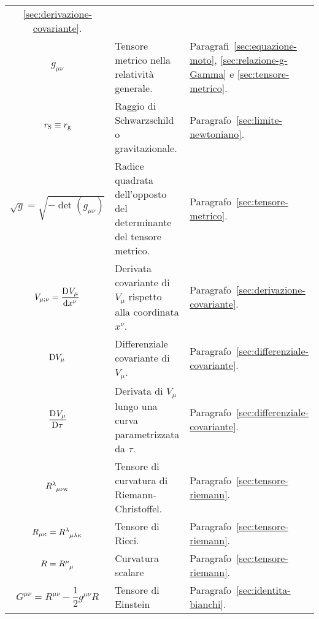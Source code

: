 \begin{longtable}{c
    p{}
    p{}}
  \ref{sec:derivazione-covariante}. \\
  $g_{\mu\nu}$ & Tensore metrico nella relatività generale. &
  Paragrafi~\ref{sec:equazione-moto}, \ref{sec:relazione-g-Gamma} e
  \ref{sec:tensore-metrico}. \\
  $r_{\textup{S}} \equiv r_{\textup{g}}$ & Raggio di Schwarzschild o
  gravitazionale. &
  Paragrafo~\ref{sec:limite-newtoniano}. \\[1.6ex]
  $\sqrt{g} = \sqrt{-\det(g_{\mu\nu})}$ & Radice quadrata dell'opposto del
  determinante del tensore metrico. & Paragrafo~\ref{sec:tensore-metrico}. \\
  $V_{\mu;\nu} = \displaystyle\frac{{\mathop{}\!\mathrm{D}^{}}V_{\mu}}{\mathop{}\!\mathrm{d} {x^{\nu}}^{}}$ & Derivata covariante
  di $V_{\mu}$ rispetto alla coordinata $x^{\nu}$. &
  Paragrafo~\ref{sec:derivazione-covariante}. \\
  $\mathop{}\!\mathrm{D} V_{\mu}$ & Differenziale covariante di $V_{\mu}$. &
  Paragrafo~\ref{sec:differenziale-covariante}. \\[1.6ex]
  $\displaystyle\frac{{\mathop{}\!\mathrm{D}^{}}V_{\mu}}{\mathop{}\!\mathrm{D} \tau^{}}$ & Derivata di $V_{\mu}$ lungo una curva
  parametrizzata da $\tau$. & Paragrafo~\ref{sec:differenziale-covariante}. \\
  $\tensor{R}{^{\lambda}_{\mu\nu\kappa}}$ & Tensore di curvatura di
  Riemann-Christoffel. & Paragrafo~\ref{sec:tensore-riemann}. \\
  $R_{\mu\kappa} = \tensor{R}{^{\lambda}_{\mu\lambda\kappa}}$ & Tensore di
  Ricci. & Paragrafo~\ref{sec:tensore-riemann}. \\[1.6ex]
  $R = \tensor{R}{^{\mu}_{\mu}}$ & Curvatura scalare &
  Paragrafo~\ref{sec:tensore-riemann}. \\[1.6ex]
  $G^{\mu\nu} = R^{\mu\nu} - \dfrac{1}{2} g^{\mu\nu}R$ & Tensore di Einstein &
  Paragrafo~\ref{sec:identita-bianchi}. \\
\end{longtable}


